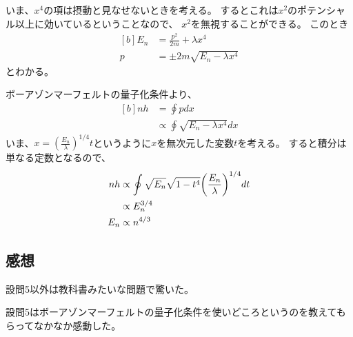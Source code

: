 \documentclass[../../sp_2018.tex]{subfiles}
\begin{document}
\subsection{}
いま、\(x^4\)の項は摂動と見なせないときを考える。
するとこれは\(x^2\)のポテンシャル以上に効いているということなので、
\(x^2\)を無視することができる。
このとき
\begin{equation}\begin{aligned}[b]
    E_n &= \frac{p^2}{2m}+\lambda x^4\\
    p &= \pm 2m\sqrt{E_n-\lambda x^4}
\end{aligned}\end{equation}
とわかる。

ボーアゾンマーフェルトの量子化条件より、
\begin{equation}\begin{aligned}[b]
    nh &= \oint p dx\\
    &\propto \oint\sqrt{E_n-\lambda x^4} dx
\end{aligned}\end{equation}
いま、\(x=(\frac{E_n}{\lambda})^{1/4}t\)というように\(x\)を無次元した変数\(t\)を考える。
すると積分は単なる定数となるので、
\begin{equation}\begin{aligned}[b]
    nh &\propto \oint \sqrt{E_n}\sqrt{1-t^4} \qty(\frac{E_n}{\lambda})^{1/4}dt\\
    &\propto E_n^{3/4}\\
    E_n &\propto n^{4/3}
\end{aligned}\end{equation}


\subsection*{感想}
設問5以外は教科書みたいな問題で驚いた。

設問5はボーアゾンマーフェルトの量子化条件を使いどころというのを教えてもらってなかなか感動した。
\end{document}
